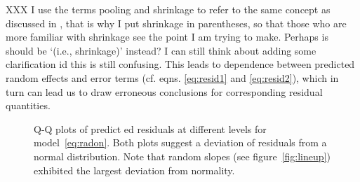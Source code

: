 \documentclass{article} %
\newcommand{\hh}[1]{{\color{orange} #1}}
\newcommand{\al}[1]{{\color{red} #1}}
\begin{document}
\al{XXX I use the terms pooling and shrinkage to refer to the same concept as discussed in \cite{Gelman:2006ue}, that is why I put shrinkage in parentheses, so that those who are more familiar with shrinkage see the point I am trying to make. Perhaps is should be `(i.e., shrinkage)' instead? I can still think about adding some clarification id this is still confusing.}
This leads to dependence between  predicted random effects and  error terms (cf. eqns. \ref{eq:resid1} and \ref{eq:resid2}), which in turn can lead us to draw erroneous conclusions for corresponding residual quantities.


\begin{figure}[!h]
	\centering
	\caption{\label{fig:qqplots1} Q-Q plots of predict\al{ed residuals} at different levels %
	for model~\eqref{eq:radon}. \hh{Both plots suggest a deviation of residuals from a normal distribution.} Note that random slopes (see figure~\ref{fig:lineup}) exhibited the largest deviation from normality. }
\end{figure}
\end{document}
